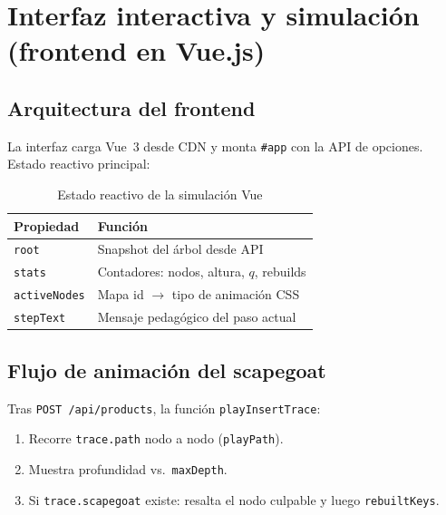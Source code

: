 \chapter{Interfaz interactiva y simulación (frontend en Vue.js)}

\section{Arquitectura del frontend}

La interfaz carga Vue~3 desde CDN y monta \texttt{\#app} con la API de opciones. Estado reactivo principal:

\begin{table}[H]
  \centering
  \caption{Estado reactivo de la simulación Vue}
  \begin{tabular}{@{}lp{9cm}@{}}
    \toprule
    \textbf{Propiedad} & \textbf{Función} \\
    \midrule
    \texttt{root} & Snapshot del árbol desde API \\
    \texttt{stats} & Contadores: nodos, altura, $q$, rebuilds \\
    \texttt{activeNodes} & Mapa id $\rightarrow$ tipo de animación CSS \\
    \texttt{stepText} & Mensaje pedagógico del paso actual \\
    \bottomrule
  \end{tabular}
\end{table}

\section{Flujo de animación del scapegoat}

Tras \texttt{POST /api/products}, la función \texttt{playInsertTrace}:
\begin{enumerate}
  \item Recorre \texttt{trace.path} nodo a nodo (\texttt{playPath}).
  \item Muestra profundidad vs.\ \texttt{maxDepth}.
  \item Si \texttt{trace.scapegoat} existe: resalta el nodo culpable y luego \texttt{rebuiltKeys}.
\end{enumerate}

